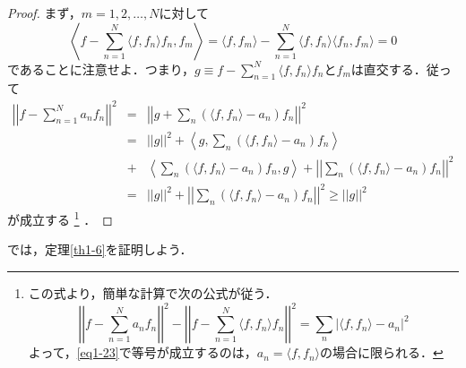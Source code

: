 \documentclass[a4j]{jsbook}
\numberwithin{theorem}{chapter}  %
\begin{document}
\begin{proof}
まず，\(m=1, 2, \dots, N\)に対して
\begin{equation*}
    \left\langle f-\sum_{n=1}^N\langle f, f_n\rangle f_n, f_m\right\rangle=\langle f, f_m\rangle-\sum_{n=1}^N\langle f, f_n\rangle\langle f_n, f_m\rangle=0
\end{equation*}
であることに注意せよ．つまり，\(\displaystyle g\equiv f-\sum_{n=1}^N\langle f, f_n\rangle f_n\)と\(f_m\)は直交する．従って
\begin{eqnarray*}
\left|\left|f-\sum_{n=1}^N a_nf_n\right|\right|^2&=&\left|\left|g+\sum_n (\langle f, f_n\rangle-a_n)f_n\right|\right|^2 \\
    &=&||g||^2+\left\langle g, \sum_n (\langle f, f_n\rangle-a_n)f_n\right\rangle \\
    &+&\left\langle\sum_n (\langle f, f_n\rangle-a_n)f_n, g\right\rangle+\left|\left|\sum_n (\langle f, f_n\rangle-a_n)f_n\right|\right|^2 \\
    &=&||g||^2+\left|\left|\sum_n (\langle f, f_n\rangle-a_n)f_n\right|\right|^2\geq||g||^2
\end{eqnarray*}
が成立する
\footnote{この式より，簡単な計算で次の公式が従う．
\begin{equation*}
    \left|\left|f-\sum_{n=1}^N a_nf_n\right|\right|^2-\left|\left|f-\sum_{n=1}^N\langle f, f_n\rangle f_n\right|\right|^2=\sum_n |\langle f, f_n\rangle-a_n|^2
\end{equation*}
よって，\eqref{eq1-23}で等号が成立するのは，\(a_n=\langle f, f_n\rangle\)の場合に限られる．
}
．
\end{proof}
では，定理\ref{th1-6}を証明しよう．
\end{document}

